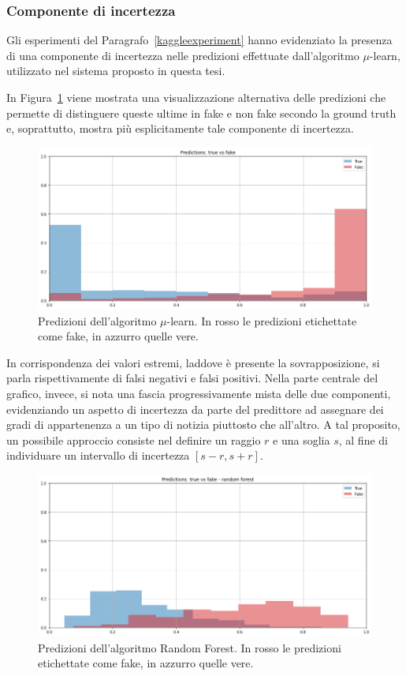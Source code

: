 \documentclass[12pt]{report}
\theoremstyle{definition}
\begin{document}
\subsubsection{Componente di incertezza}
Gli esperimenti del Paragrafo~\ref{kaggleexperiment} hanno evidenziato la presenza di una componente di incertezza nelle predizioni effettuate dall'algoritmo $\mu$-learn, utilizzato nel sistema proposto in questa tesi. 

In Figura~\ref{overlaypred} viene mostrata una visualizzazione alternativa delle predizioni che permette di distinguere queste ultime in fake e non fake secondo la ground truth e, soprattutto, mostra più esplicitamente tale componente di incertezza.
\begin{figure}
    \centering
    \includegraphics[scale=0.48]{images/experiment_kaggle/overlaypred.png}
    \caption{Predizioni dell'algoritmo $\mu$-learn. In rosso le predizioni etichettate come fake, in azzurro quelle vere.}
    \label{overlaypred}
\end{figure}
In corrispondenza dei valori estremi, laddove è presente la sovrapposizione, si parla rispettivamente di falsi negativi e falsi positivi. Nella parte centrale del grafico, invece, si nota una fascia progressivamente mista delle due componenti, evidenziando un aspetto di incertezza da parte del predittore ad assegnare dei gradi di appartenenza a un tipo di notizia piuttosto che all'altro.
A tal proposito, un possibile approccio consiste nel definire un raggio $r$ e una soglia $s$, al fine di individuare un intervallo di incertezza $[s-r,s+r]$.
\begin{figure}
    \centering
    \includegraphics[scale=0.48]{images/experiment_kaggle/indecisionrf.png}
    \caption{Predizioni dell'algoritmo Random Forest. In rosso le predizioni etichettate come fake, in azzurro quelle vere.}
    \label{indecisionrf}
\end{figure}
\end{document}
